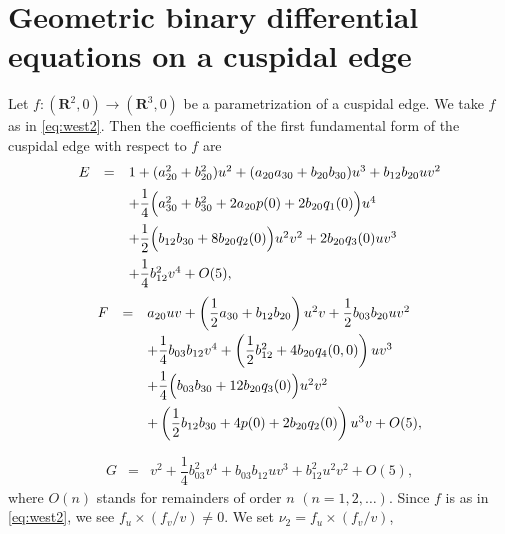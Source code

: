 \documentclass[a4paper, 12pt]{article}
\theoremstyle{definition}
\numberwithin{equation}{section}
\begin{document}
\section{Geometric binary differential equations on a cuspidal edge}
Let $f:({\boldsymbol{R}}^2,0)\to({\boldsymbol{R}}^3,0)$ be a parametrization of 
a cuspidal edge.
We take $f$ as in \eqref{eq:west2}.
Then the coefficients of the first fundamental form 
of the cuspidal edge with respect to $f$ are
\begin{equation} \label{coeff:1ff1}
\begin{array}{rcl}
E
&=&
 1+(a_{20}^2 + b_{20}^2)u^2 
+(a_{20} a_{30}+b_{20} b_{30})u^3 
+  b_{12} b_{20} uv^2 \\[2mm]
& & \hspace{0mm}
+ \dfrac{1}{4}\Big(a_{30}^2 + b_{30}^2 + 2 a_{20} p(0)
+2 b_{20} q_1(0)\Big) u^4 \\[3mm]
 & & \hspace{0mm}
+\dfrac{1}{2}\Big(b_{12} b_{30}+8 b_{20}q_2(0)\Big) u^2v^2
+2b_{20}q_3(0) uv^3\\[3mm]
 & & \hspace{0mm}
+\dfrac{1}{4}b_{12}^2 v^4 + O(5),
\end{array}
\end{equation}
\begin{equation} \label{coeff:1ff2}
\begin{array}{rcl}
F
&=& 
 a_{20}uv 
+ \left(\dfrac{1}{2}a_{30}+ b_{12}b_{20}\right)u^2v 
+ \dfrac{1}{2}b_{03}b_{20}uv^2\\[3mm]
& &
+ \dfrac{1}{4}b_{03} b_{12} v^4 
+\left(\dfrac{1}{2}b_{12}^2+4 b_{20} q_4(0,0)\right) u v^3\\[3mm]
& &
+\dfrac{1}{4}\Big(b_{03} b_{30}+12 b_{20} q_3(0)\Big)u^2 v^2\\[3mm]
& & 
\hspace{0mm}+ 
\left(\dfrac{1}{2}b_{12} b_{30}+4p(0)+2 b_{20} q_2(0)\right) u^3v 
+ O(5), \\[3mm]
\end{array}
\end{equation}
\begin{equation} \label{coeff:1ff3}
\begin{array}{rcl}
G
&=& 
v^2+ \dfrac{1}{4}b_{03}^2 v^4+b_{03} b_{12} u v^3+b_{12}^2 u^2v^2
+ O(5),
\end{array}
\end{equation}
where $O(n)$ stands for remainders of order $n$ 
$(n=1,2,\ldots)$.
Since $f$ is as in \eqref{eq:west2},
we see $f_u\times (f_v/v)\ne0$.
We set $\nu_2=f_u\times (f_v/v)$,
\end{document}
